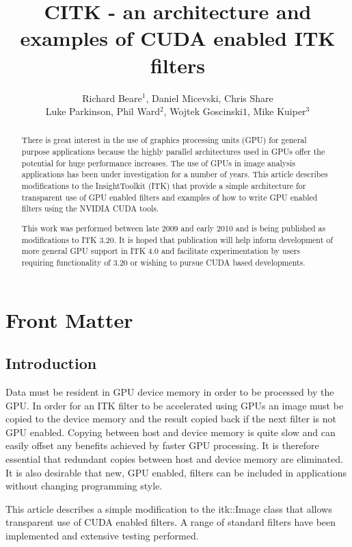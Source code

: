 \documentclass{InsightArticle}
\title{CITK - an architecture and examples of CUDA enabled ITK filters}
\author{Richard Beare{$^1$}, Daniel Micevski, Chris Share\\Luke
  Parkinson, Phil Ward{$^2$}, Wojtek Goscinski{$1$}, Mike Kuiper{$^3$}}
\newcommand{\IJhandlerIDnumber}{3269}
\begin{document}
\IJhandlefooter{\IJhandlerIDnumber}
\maketitle

\ifhtml
\chapter*{Front Matter\label{front}}
\fi


\begin{abstract}
\noindent
There is great interest in the use of graphics processing units (GPU)
for general purpose applications because the highly parallel
architectures used in GPUs offer the potential for huge performance
increases. The use of GPUs in image analysis applications has been
under investigation for a number of years. This article describes
modifications to the InsightToolkit (ITK) that provide a simple
architecture for transparent use of GPU enabled filters and examples
of how to write GPU enabled filters using the NVIDIA CUDA tools.

This work was performed between late 2009 and early 2010 and is being
published as modifications to ITK 3.20. It is hoped that publication will
help inform development of more general GPU support in ITK 4.0 and
facilitate experimentation by users requiring functionality of 3.20 or
wishing to pursue CUDA based developments.
\end{abstract}

\tableofcontents

\section{Introduction}
Data must be resident in GPU device memory in order to be processed by
the GPU. In order for an ITK filter to be accelerated using GPUs an
image must be copied to the device memory and the result copied back
if the next filter is not GPU enabled. Copying between host and device
memory is quite slow and can easily offset any benefits achieved by
faster GPU processing. It is therefore essential that redundant copies
between host and device memory are eliminated. It is also desirable
that new, GPU enabled, filters can be included in applications without
changing programming style.

This article describes a simple modification to the itk::Image class
that allows transparent use of CUDA enabled filters. A range of
standard filters have been implemented and extensive testing
performed.
\end{document}

